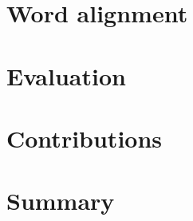 


% 



\tableofcontents





\chapter{Word alignment}

\chapter{Evaluation}
\chapter{Contributions}
\chapter{Summary}

%
\printbibliography
